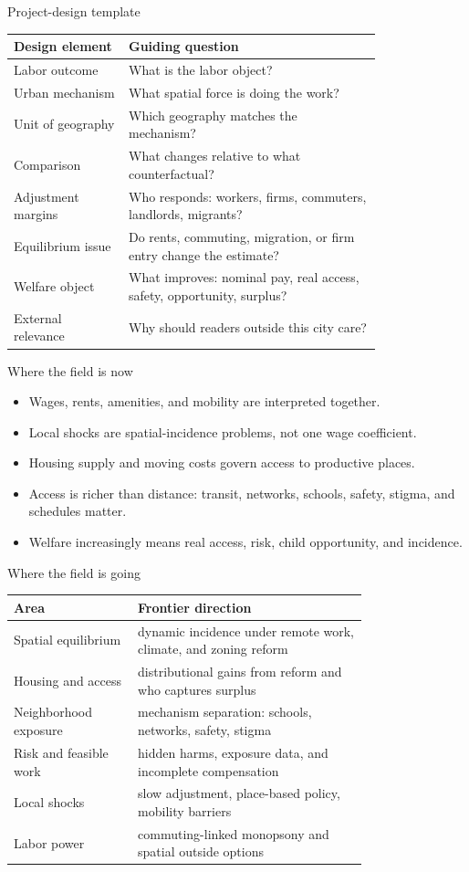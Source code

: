 \documentclass[aspectratio=169,11pt]{beamer}
\begin{document}
\begin{frame}{Project-design template}
\small
\begin{tabular}{p{0.25\linewidth} p{0.55\linewidth}}
\toprule
Design element & Guiding question \\
\midrule
Labor outcome & What is the labor object? \\
Urban mechanism & What spatial force is doing the work? \\
Unit of geography & Which geography matches the mechanism? \\
Comparison & What changes relative to what counterfactual? \\
Adjustment margins & Who responds: workers, firms, commuters, landlords, migrants? \\
Equilibrium issue & Do rents, commuting, migration, or firm entry change the estimate? \\
Welfare object & What improves: nominal pay, real access, safety, opportunity, surplus? \\
External relevance & Why should readers outside this city care? \\
\bottomrule
\end{tabular}
\end{frame}

\begin{frame}{Where the field is now}
\begin{itemize}
    \item Wages, rents, amenities, and mobility are interpreted together.
    \item Local shocks are spatial-incidence problems, not one wage coefficient.
    \item Housing supply and moving costs govern access to productive places.
    \item Access is richer than distance: transit, networks, schools, safety, stigma, and schedules matter.
    \item Welfare increasingly means real access, risk, child opportunity, and incidence.
\end{itemize}
\end{frame}

\begin{frame}{Where the field is going}
\small
\begin{tabular}{p{0.27\linewidth} p{0.50\linewidth}}
\toprule
Area & Frontier direction \\
\midrule
Spatial equilibrium & dynamic incidence under remote work, climate, and zoning reform \\
Housing and access & distributional gains from reform and who captures surplus \\
Neighborhood exposure & mechanism separation: schools, networks, safety, stigma \\
Risk and feasible work & hidden harms, exposure data, and incomplete compensation \\
Local shocks & slow adjustment, place-based policy, mobility barriers \\
Labor power & commuting-linked monopsony and spatial outside options \\
\bottomrule
\end{tabular}
\end{frame}
\end{document}
